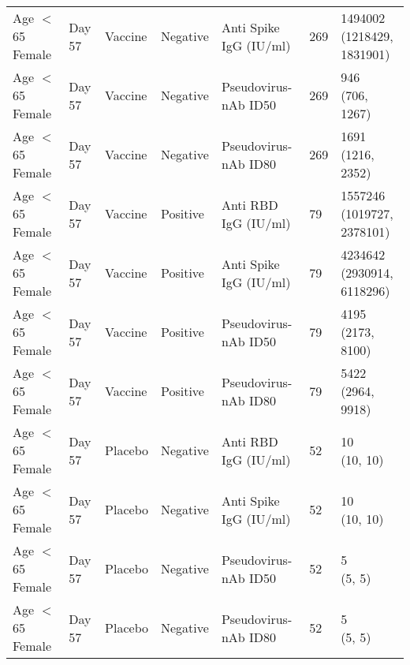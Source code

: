 \documentclass[]{book}
\theoremstyle{definition}
\theoremstyle{definition}
\theoremstyle{definition}
\newcommand{\1}{\mathbbm{1}}
\begin{document}
\begin{landscape}
\begin{ThreePartTable}
\begin{longtable}[t]{>{\raggedright\arraybackslash}p{7cm}llllll}
\hspace{1em}Age $<$ 65 Female & Day 57 & Vaccine & Negative & Anti Spike IgG (IU/ml) & 269 & \makecell[l]{1494002\\(1218429, 1831901)}\\
\hspace{1em}Age $<$ 65 Female & Day 57 & Vaccine & Negative & Pseudovirus-nAb ID50 & 269 & \makecell[l]{946\\(706, 1267)}\\
\hspace{1em}Age $<$ 65 Female & Day 57 & Vaccine & Negative & Pseudovirus-nAb ID80 & 269 & \makecell[l]{1691\\(1216, 2352)}\\
\hspace{1em}Age $<$ 65 Female & Day 57 & Vaccine & Positive & Anti RBD IgG (IU/ml) & 79 & \makecell[l]{1557246\\(1019727, 2378101)}\\
\hspace{1em}Age $<$ 65 Female & Day 57 & Vaccine & Positive & Anti Spike IgG (IU/ml) & 79 & \makecell[l]{4234642\\(2930914, 6118296)}\\
\hspace{1em}Age $<$ 65 Female & Day 57 & Vaccine & Positive & Pseudovirus-nAb ID50 & 79 & \makecell[l]{4195\\(2173, 8100)}\\
\hspace{1em}Age $<$ 65 Female & Day 57 & Vaccine & Positive & Pseudovirus-nAb ID80 & 79 & \makecell[l]{5422\\(2964, 9918)}\\
\hspace{1em}Age $<$ 65 Female & Day 57 & Placebo & Negative & Anti RBD IgG (IU/ml) & 52 & \makecell[l]{10\\(10, 10)}\\
\hspace{1em}Age $<$ 65 Female & Day 57 & Placebo & Negative & Anti Spike IgG (IU/ml) & 52 & \makecell[l]{10\\(10, 10)}\\
\hspace{1em}Age $<$ 65 Female & Day 57 & Placebo & Negative & Pseudovirus-nAb ID50 & 52 & \makecell[l]{5\\(5, 5)}\\
\hspace{1em}Age $<$ 65 Female & Day 57 & Placebo & Negative & Pseudovirus-nAb ID80 & 52 & \makecell[l]{5\\(5, 5)}\\

\end{longtable}
\end{ThreePartTable}
\end{landscape}
\end{document}
